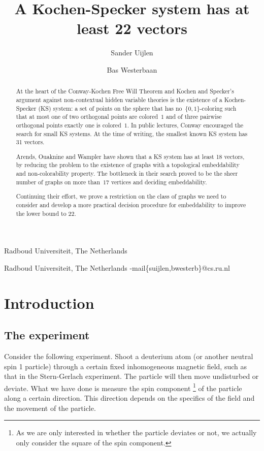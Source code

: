 \documentclass{report}
\begin{document}
\title{A Kochen-Specker system has at least 22 vectors}
\author{Sander Uijlen}{Radboud Universiteit, The Netherlands}
\author{Bas Westerbaan}{Radboud Universiteit, The Netherlands}
\E-mail{\{suijlen,bwesterb\}@cs.ru.nl}

\begin{abstract}
    At the heart of the Conway-Kochen
    Free Will Theorem and Kochen and Specker's
        argument against non-contextual hidden variable theories
    is the existence of a Kochen-Specker (KS) system:
    a set of points on the sphere
    that has no~$\{0,1\}$-coloring such that
    at most one of two orthogonal points are colored~$1$
    and of three pairwise orthogonal points exactly one
    is colored~$1$.
    In public lectures, Conway encouraged the search for small
    KS systems.
    At the time of writing, the smallest known
    KS system has 31 vectors.  

    Arends, Ouaknine and Wampler have shown that a KS system has at least
    18 vectors, by reducing the problem to the existence of graphs
    with a topological embeddability and non-colorability property.
    The bottleneck in their search
    proved to be the sheer number of graphs on more than~$17$
    vertices and deciding embeddability.

    Continuing their effort, we prove a restriction on the class of graphs
    we need to consider and develop a more practical decision procedure for
    embeddability to improve the lower bound to 22.
\end{abstract}

\clearpage
\section{Introduction}

\subsection{The experiment}
Consider the following experiment.  Shoot a deuterium
atom (or another neutral spin 1 particle)
through a certain fixed inhomogeneous magnetic field,
such as that in the Stern-Gerlach experiment.
The particle will then move undisturbed or deviate.
What we have done is measure the spin component%
\footnote{%
As we are only interested in whether the particle deviates or
    not, we actually only consider the square of the spin component.}
 of the particle
along a certain direction.  This direction depends on the specifics of the
field and the movement of the particle.
\end{document}
